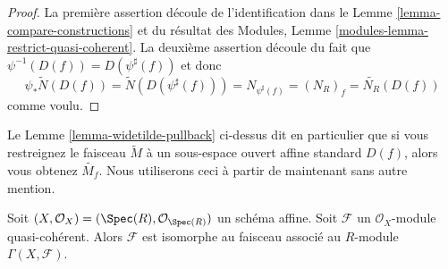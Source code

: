 \begin{proof}
La première assertion découle de l'identification dans le Lemme  \ref{lemma-compare-constructions}  et du
résultat des Modules, Lemme  \ref{modules-lemma-restrict-quasi-coherent}. La deuxième assertion découle du fait
que  $\psi^{-1}(D(f)) = D(\psi^\sharp(f))$  et donc
$$
\psi_* \widetilde N(D(f)) = \widetilde N(D(\psi^\sharp(f))) =
N_{\psi^\sharp(f)} = (N_R)_f = \widetilde{N_R}(D(f))
$$
comme voulu.
\end{proof}

\noindent
Le Lemme  \ref{lemma-widetilde-pullback}  ci-dessus dit en particulier que si vous restreignez le
faisceau  $\widetilde M$  à un sous-espace ouvert affine standard  $D(f)$, alors
vous obtenez  $\widetilde{M_f}$. Nous utiliserons ceci à partir de maintenant sans autre
mention.

\begin{lemma}
\label{lemma-quasi-coherent-affine}
Soit  $(X, \mathcal{O}_X) = (\Spec(R), \mathcal{O}_{\Spec(R)})$  un schéma affine. Soit  $\mathcal{F}$  un  $\mathcal{O}_X$-module
quasi-cohérent. Alors  $\mathcal{F}$  est isomorphe au faisceau associé au
 $R$-module  $\Gamma(X, \mathcal{F})$.
\end{lemma}

